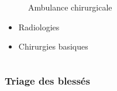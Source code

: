 \documentclass{beamer}
\renewcommand{\tiny}{\fontsize{6pt}{7pt}\selectfont}
\begin{document}
\begin{frame}
\begin{columns}
\begin{column}{0.45\linewidth}
\begin{figure}
							\caption{\tiny Ambulance chirurgicale}
						\end{figure}
						\begin{itemize}
							\item Radiologies
							\item Chirurgies basiques
						\end{itemize}
					\end{column}
				\end{columns}
					
			\end{frame}
			
			
			\subsubsection{Triage des blessés}
\end{document}
